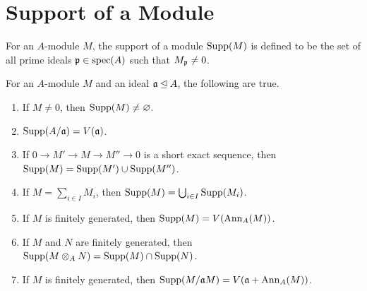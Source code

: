 \section{Support of a Module}

\begin{definition}
    For an $A$-module $M$, the support of a module $\operatorname{Supp}(M)$ is defined to be the set of all prime ideals $\mathfrak p\in\operatorname{spec}(A)$ such that $M_\mathfrak p\ne 0$.
\end{definition}

\begin{theorem}
    For an $A$-module $M$ and an ideal $\mathfrak a\unlhd A$, the following are true. 
    \begin{enumerate}[label=(\alph*)]
        \item If $M\ne 0$, then $\operatorname{Supp}(M)\ne\varnothing$. 
        \item $\operatorname{Supp}(A/\mathfrak a) = V(\mathfrak a)$.
        \item If $0\to M'\to M\to M''\to 0$ is a short exact sequence, then $\operatorname{Supp}(M) = \operatorname{Supp}(M')\cup\operatorname{Supp}(M'')$. 
        \item If $M = \sum_{i\in I} M_i$, then $\operatorname{Supp}(M) = \bigcup_{i\in I}\operatorname{Supp}(M_i)$. 
        \item If $M$ is finitely generated, then $\operatorname{Supp}(M) = V(\operatorname{Ann}_A(M))$. 
        \item If $M$ and $N$ are finitely generated, then $\operatorname{Supp}(M\otimes_A N) = \operatorname{Supp}(M)\cap\operatorname{Supp}(N)$. 
        \item If $M$ is finitely generated, then $\operatorname{Supp}(M/\mathfrak a M) = V(\mathfrak a + \operatorname{Ann}_A(M))$.
    \end{enumerate}
\end{theorem}
